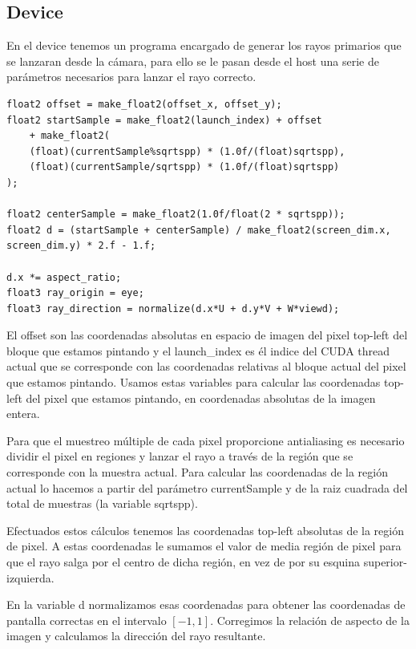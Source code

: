 \clearpage

\subsection{Device}

En el device tenemos un programa encargado de generar los rayos primarios que se lanzaran desde la cámara, para ello se le pasan desde el host una serie de parámetros necesarios para lanzar el rayo correcto.

\begin{lstlisting}
float2 offset = make_float2(offset_x, offset_y);
float2 startSample = make_float2(launch_index) + offset 
	+ make_float2(
	(float)(currentSample%sqrtspp) * (1.0f/(float)sqrtspp),
	(float)(currentSample/sqrtspp) * (1.0f/(float)sqrtspp)
);

float2 centerSample = make_float2(1.0f/float(2 * sqrtspp));
float2 d = (startSample + centerSample) / make_float2(screen_dim.x, screen_dim.y) * 2.f - 1.f;

d.x *= aspect_ratio;
float3 ray_origin = eye;
float3 ray_direction = normalize(d.x*U + d.y*V + W*viewd);
\end{lstlisting}

El offset son las coordenadas absolutas en espacio de imagen del pixel top-left del bloque que estamos pintando y el launch\_index es él indice del CUDA thread actual que se corresponde con las coordenadas relativas al bloque actual del pixel que estamos pintando. Usamos estas variables para calcular las coordenadas top-left del pixel que estamos pintando, en coordenadas absolutas de la imagen entera.

\medskip

Para que el muestreo múltiple de cada pixel proporcione antialiasing es necesario dividir el pixel en regiones y lanzar el rayo a través de la región que se corresponde con la muestra actual. Para calcular las coordenadas de la región actual lo hacemos a partir del parámetro currentSample y de la raiz cuadrada del total de muestras (la variable sqrtspp).

\medskip

Efectuados estos cálculos tenemos las coordenadas top-left absolutas de la región de pixel. A estas coordenadas le sumamos el valor de media región de pixel para que el rayo salga por el centro de dicha región, en vez de por su esquina superior-izquierda.

\medskip

En la variable d normalizamos esas coordenadas para obtener las coordenadas de pantalla correctas en el intervalo $[-1, 1]$. Corregimos la relación de aspecto de la imagen y calculamos la dirección del rayo resultante.

